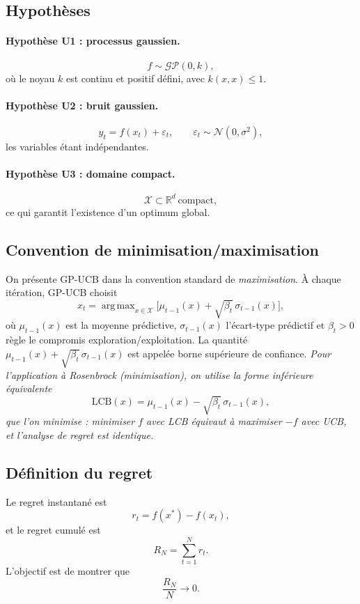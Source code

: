 \documentclass[12pt]{article}
\newcommand{\R}{\mathbb{R}}
\newcommand{\N}{\mathcal{N}}
\newcommand{\X}{\mathcal{X}}
\newcommand{\GP}{\mathcal{GP}}
\newcommand{\xs}{x^{*}}
\DeclareMathOperator*{\argmax}{arg\,max}
\begin{document}
\subsection*{Hypothèses}

\paragraph{Hypothèse U1 : processus gaussien.}
\[
f \sim \GP(0,k),
\]
où le noyau $k$ est continu et positif défini, avec $k(x,x)\le 1$.

\paragraph{Hypothèse U2 : bruit gaussien.}
\[
y_t = f(x_t) + \varepsilon_t,
\qquad
\varepsilon_t \sim \N(0,\sigma^2),
\]
les variables étant indépendantes.

\paragraph{Hypothèse U3 : domaine compact.}
\[
\X \subset \R^d \ \text{compact},
\]
ce qui garantit l'existence d'un optimum global.

\subsection*{Convention de minimisation/maximisation}

On présente GP-UCB dans la convention standard de \emph{maximisation}. À chaque
itération, GP-UCB choisit
\[
\boxed{\, x_t = \argmax_{x \in \X}\bigl[ \mu_{t-1}(x) + \sqrt{\beta_t}\,\sigma_{t-1}(x) \bigr], \,}
\]
où $\mu_{t-1}(x)$ est la moyenne prédictive, $\sigma_{t-1}(x)$ l'écart-type
prédictif et $\beta_t > 0$ règle le compromis exploration/exploitation. La
quantité $\mu_{t-1}(x) + \sqrt{\beta_t}\,\sigma_{t-1}(x)$ est appelée borne
supérieure de confiance. \emph{Pour l'application à Rosenbrock (minimisation), on
utilise la forme inférieure équivalente}
\[
\mathrm{LCB}(x) = \mu_{t-1}(x) - \sqrt{\beta_t}\,\sigma_{t-1}(x),
\]
\emph{que l'on minimise : minimiser $f$ avec LCB équivaut à maximiser $-f$ avec
UCB, et l'analyse de regret est identique.}

\subsection*{Définition du regret}

Le regret instantané est
\[
r_t = f(\xs) - f(x_t),
\]
et le regret cumulé est
\[
R_N = \sum_{t=1}^N r_t.
\]
L'objectif est de montrer que
\[
\frac{R_N}{N} \longrightarrow 0.
\]
\end{document}
